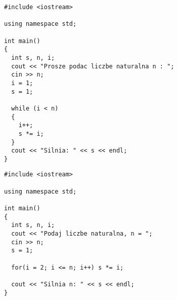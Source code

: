 \documentclass[a4paper]{article}
\begin{document}
\begin{lstlisting}[caption=Obliczanie silni while, captionpos=b, label=src:silnia_while, frame=lbtr]
#include <iostream>

using namespace std;

int main()
{
  int s, n, i;
  cout << "Prosze podac liczbe naturalna n : ";
  cin >> n;
  i = 1;
  s = 1;
  
  while (i < n)
  {
    i++;
    s *= i;
  }
  cout << "Silnia: " << s << endl;
}
\end{lstlisting}


\begin{lstlisting}[caption=Obliczanie silni for, captionpos=b, label=src:silnia_for, frame=lbtr]
#include <iostream>

using namespace std;

int main()
{
  int s, n, i;  
  cout << "Podaj liczbe naturalna, n = ";
  cin >> n;
  s = 1;  
  
  for(i = 2; i <= n; i++) s *= i;  
  
  cout << "Silnia n: " << s << endl;
}

\end{lstlisting}
\end{document}
